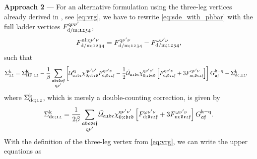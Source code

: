 \documentclass[../../main.tex]{subfiles}
\begin{document}
\\\\
\textbf{Approach 2} --- For an alternative formulation using the three-leg vertices already derived in , see \eqref{eq:vrg}, we have to rewrite \eqref{eq:sde_with_phbar} with the full ladder vertices $F^{\text{q}\nu\nu'}_{\text{d}/\text{m};\mathfrak{1234}}$,
\begin{align}
	F^{\text{nl};\text{q}\nu'\nu}_{\text{d}/\text{m};\mathfrak{1234}}=F^{\text{q}\nu'\nu}_{\text{d}/\text{m};\mathfrak{1234}}-F^{\omega\nu'\nu}_{\text{d}/\text{m};\mathfrak{1234}},
\end{align}
such that
\begin{align}
	\Sigma^{\text{k}}_{\mathfrak{12}}&=\Sigma_{\text{HF};\mathfrak{12}}^{\textbf{k}} -\frac1\beta\sum_{\substack{\mathfrak{abcdef}\\\text{q}\nu'}}\left [\mathcal{U}^{\textbf{q}}_{\mathfrak{a1bc}}\chi^{\text{q}\nu'\nu'}_{0;\mathfrak{cbed}} F^{\text{q}\nu'\nu}_{\text{d};\mathfrak{de2f}}-\frac12\tilde{\mathcal{U}}_{\mathfrak{a1bc}}\chi^{\text{q}\nu'\nu'}_{0;\mathfrak{cbed}}\left [F^{\text{q}\nu'\nu}_{\text{d};\mathfrak{de2f}}+3 F^{\text{q}\nu'\nu}_{\text{m};\mathfrak{de2f}}\right ]\right ]G_{\mathfrak{af}}^{\text{k}-\text{q}} - \Sigma^{\text{k}}_{\text{dc};\mathfrak{12}},
\end{align}
where $\Sigma^{\text{k}}_{\text{dc};\mathfrak{12}}$, which is merely a double-counting correction, is given by
\begin{align}
	\Sigma^{\text{k}}_{\text{dc};\mathfrak{12}} = \frac{1}{2\beta}\sum_{\substack{\mathfrak{abcdef}\\\text{q}\nu'}}\tilde{\mathcal{U}}_{\mathfrak{a1bc}}\chi^{\text{q}\nu'\nu'}_{0;\mathfrak{cbed}}\left [F^{\omega\nu'\nu}_{\text{d};\mathfrak{de2f}}+3 F^{\omega\nu'\nu}_{\text{m};\mathfrak{de2f}}\right ]G_{\mathfrak{af}}^{\text{k}-\text{q}}.
\end{align}
With the definition of the three-leg vertex from \eqref{eq:vrg}, we can write the upper equations as
\end{document}
